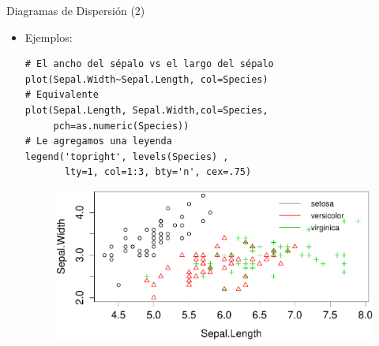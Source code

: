 \documentclass[handout]{beamer}
\begin{document}
\begin{frame}[fragile]{Diagramas de Dispersión (2)}
\scriptsize{
\begin{itemize}
 \item Ejemplos:
 \begin{verbatim}
# El ancho del sépalo vs el largo del sépalo  
plot(Sepal.Width~Sepal.Length, col=Species)
# Equivalente
plot(Sepal.Length, Sepal.Width,col=Species,
     pch=as.numeric(Species))
# Le agregamos una leyenda
legend('topright', levels(Species) , 
       lty=1, col=1:3, bty='n', cex=.75)  
 \end{verbatim}

  \begin{figure}[h!]
	\centering
	\includegraphics[scale=0.5]{imagenes/scatter1.pdf}		
\end{figure} 
 
 
\end{itemize}




}
 
\end{frame}
\end{document}
